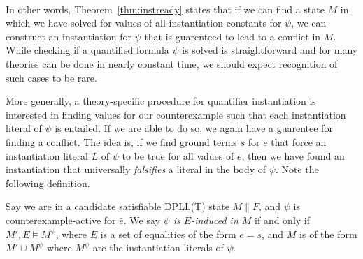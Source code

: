 \documentclass{llncs}
\newtheorem{cor}{Corollary}
\begin{document}
\ \\ 

\begin{comment}
\begin{cor}
\label{cor:instready}
Given a candidate-satisifiable DPLL(T) state $M \parallel F$, for all quantified formula $\psi \in M$,
if $\psi$ is counterexample-active in $M \parallel F$ and solved in $M$, then the instantiation clause $( \neg \psi$ $\vee$ $\varphi[rep_M( \bar{e} )/\bar{x}])$ has not been added to $F$.
\end{cor}
\begin{proof}
The proof is immediate, noting that by Theorem~\ref{thm:instready}, $( \neg \psi \vee \varphi[rep_M( \bar{e} )/\bar{x}])$ is $T$-unsatisifiable in $M$, and therefore cannot be satisfied in $M \parallel F$. $\Box$
\end{proof}
Corollary~\ref{cor:instready} states that if we can find such an instantiation, then it has not yet been applied.
This fact guarentees that no redundant instantiations are used in certain instantiation schemes.
\end{comment}

In other words, Theorem~\ref{thm:instready} states that if we can find a state $M$ in which we have solved for values of all instantiation constants for $\psi$, we can construct an instantiation for $\psi$ that is guarenteed to lead to a conflict in $M$.
While checking if a quantified formula $\psi$ is solved is straightforward and for many theories can be done in nearly constant time, we should expect recognition of such cases to be rare.

More generally, a theory-specific procedure for quantifier instantiation is interested in finding values for our counterexample such that each instantiation literal of $\psi$ is entailed.
If we are able to do so, we again have a guarentee for finding a conflict.
The idea is, if we find ground terms $\bar{s}$ for $\bar{e}$ that force an instantiation literal $L$ of $\psi$ to be true for all values of $\bar{e}$, then we have found an instantiation that universally \emph{falsifies} a literal in the body of $\psi$.
Note the following definition.

\begin{definition}[E-induced]
Say we are in a candidate satisfiable DPLL(T) state $M \parallel F$, and $\psi$ is counterexample-active for $\bar{e}$.
We say \emph{$\psi$ is $E$-induced in $M$} if and only if $M', E \models M^\psi$, where $E$ is a set of equalities of the form $\bar{e} = \bar{s}$, and $M$ is of the form $M' \cup M^\psi$ where $M^\psi$ are the instantiation literals of $\psi$.
\end{definition}
\end{document}
